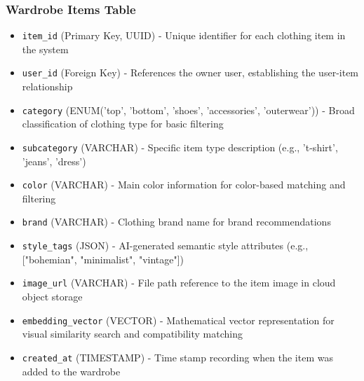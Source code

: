 \subsubsection{Wardrobe Items Table}
\begin{itemize}
    \item \texttt{item\_id} (Primary Key, UUID) - Unique identifier for each clothing item in the system
    \item \texttt{user\_id} (Foreign Key) - References the owner user, establishing the user-item relationship
    \item \texttt{category} (ENUM('top', 'bottom', 'shoes', 'accessories', 'outerwear')) - Broad classification of clothing type for basic filtering
    \item \texttt{subcategory} (VARCHAR) - Specific item type description (e.g., 't-shirt', 'jeans', 'dress')
    \item \texttt{color} (VARCHAR) - Main color information for color-based matching and filtering
    \item \texttt{brand} (VARCHAR) - Clothing brand name for brand recommendations
    \item \texttt{style\_tags} (JSON) - AI-generated semantic style attributes (e.g., ["bohemian", "minimalist", "vintage"])
    \item \texttt{image\_url} (VARCHAR) - File path reference to the item image in cloud object storage
    \item \texttt{embedding\_vector} (VECTOR) - Mathematical vector representation for visual similarity search and compatibility matching
    \item \texttt{created\_at} (TIMESTAMP) - Time stamp recording when the item was added to the wardrobe
\end{itemize}


